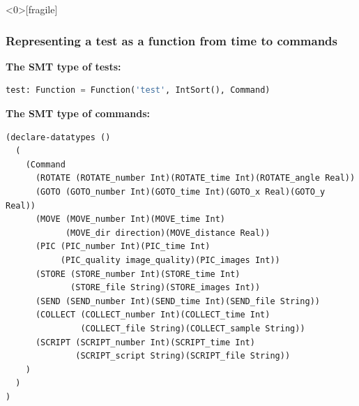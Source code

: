 \begin{frame}<0>[fragile]
  \frametitle{Representing a test as a function from time to commands} \small

{\bf The SMT type of tests:}

\begin{lstlisting}[language=python,frame=single]
test: Function = Function('test', IntSort(), Command)
\end{lstlisting}

\pause

{\bf The SMT type of commands:}

{\scriptsize
\begin{verbatim}
(declare-datatypes ()
  (
    (Command
      (ROTATE (ROTATE_number Int)(ROTATE_time Int)(ROTATE_angle Real))
      (GOTO (GOTO_number Int)(GOTO_time Int)(GOTO_x Real)(GOTO_y Real))
      (MOVE (MOVE_number Int)(MOVE_time Int)
            (MOVE_dir direction)(MOVE_distance Real))
      (PIC (PIC_number Int)(PIC_time Int)
           (PIC_quality image_quality)(PIC_images Int))
      (STORE (STORE_number Int)(STORE_time Int)
             (STORE_file String)(STORE_images Int))
      (SEND (SEND_number Int)(SEND_time Int)(SEND_file String))
      (COLLECT (COLLECT_number Int)(COLLECT_time Int)
               (COLLECT_file String)(COLLECT_sample String))
      (SCRIPT (SCRIPT_number Int)(SCRIPT_time Int)
              (SCRIPT_script String)(SCRIPT_file String))
    )
  )
)    
\end{verbatim}
}

\end{frame}


